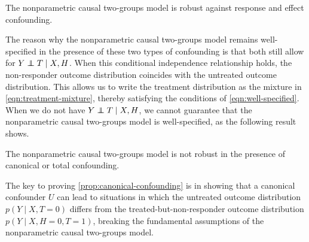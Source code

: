 \begin{proposition}
\label{prop:confounding-npc2g}
The nonparametric causal two-groups model is robust against response and effect confounding.
\end{proposition}

The reason why the nonparametric causal two-groups model remains well-specified in the presence of these two types of confounding is that both still allow for $Y \perp\!\!\!\!\perp T \mid X,  H$. When this conditional independence relationship holds, the non-responder outcome distribution coincides with the untreated outcome distribution. This allows us to write the treatment distribution as the mixture in \cref{eqn:treatment-mixture}, thereby satisfying the conditions of \cref{eqn:well-specified}. When we do not have $Y \perp\!\!\!\!\perp T \mid X,  H$, we cannot guarantee that the nonparametric causal two-groups model is well-specified, as the following result shows.

\begin{proposition}
\label{prop:canonical-confounding}
The nonparametric causal two-groups model is not robust in the presence of canonical or total confounding.
\end{proposition}

The key to proving \cref{prop:canonical-confounding} is in showing that a canonical confounder $U$ can lead to situations in which the untreated outcome distribution $p(Y \mid X, T=0)$ differs from the treated-but-non-responder outcome distribution $p(Y \mid X, H=0, T=1)$, breaking the fundamental assumptions of the nonparametric causal two-groups model.


